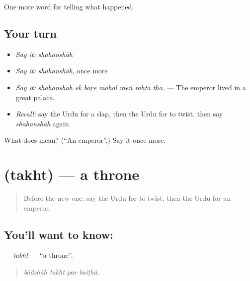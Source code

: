\begin{grammarlens}[title={What you've built}]
One more word for telling what happened.
\end{grammarlens}

\subsection*{Your turn}
\begin{itemize}
\raggedright
  \item \emph{Say it:} \emph{shahanshāh}
  \item \emph{Say it:} \emph{shahanshāh}, once more
  \item \emph{Say it:} \emph{shahanshāh ek baṛe mahal meṅ rahtā thā.} — The emperor lived in a great palace.
  \item \emph{Recall:} say the Urdu for a slap, then the Urdu for to twist, then say \emph{shahanshāh} again
\end{itemize}

\begin{tcolorbox}[breakable,colback=teal!4,colframe=teal!35!black,title={Before you move on}]
What does  mean? (\textquotedblleft{}An emperor\textquotedblright{}.) Say it once more.
\end{tcolorbox}
\section[\texorpdfstring{\ur{تخت} (takht)}{تخت (takht)}]{ (takht) — a throne}

\label{lesson:UR-C308-takht}



\begin{quote}
Before the new one: say the Urdu for to twist, then the Urdu for an emperor.
\end{quote}

\subsection*{You'll want to know: }
\textbf{} — \emph{takht} — \textquotedblleft{}a throne\textquotedblright{}.

\begin{quote}
   
\end{quote}

\begin{quote}
\emph{bādshāh takht par baiṭhā.}
\end{quote}

